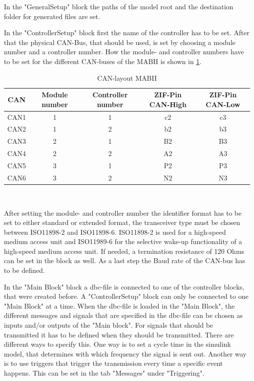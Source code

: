 \documentclass[ExampleMasters.tex]{subfiles}
\begin{document}
In the "GeneralSetup" block the paths of the model root and the destination folder for generated files are set. 

In the "ControllerSetup" block first the name of the controller has to be set. After that the physical CAN-Bus, that should be used, is set by choosing a module number and a controller number. How the module- and controller numbers have to be set for the different CAN-buses of the MABII is shown in \ref{tab:CAN-layout}.
\begin{table}[h]
	\centering
	\caption{CAN-layout MABII}
	\label{tab:CAN-layout}
	\begin{tabular}{c|c|c|c|c|}
		CAN   & Module number & Controller number & ZIF-Pin CAN-High & ZIF-Pin CAN-Low  \\ \hline
		CAN1     &       1 & 1  & c2 & c3         \\
		CAN2   &      1 & 2  & b2 & b3    \\
		CAN3 &      2 & 1 & B2 & B3        \\
		CAN4& 2 & 2 & A2 & A3  \\
		CAN5& 3 & 1 & P2 & P3 \\
		CAN6& 3 & 2 & N2 & N3 \\
	\end{tabular} \\
\end{table}

After setting the module- and controller number the identifier format has to be set to either standard or extended format, the transceiver type must be chosen between ISO11898-2 and ISO11898-6. ISO11898-2 is used for a high-speed medium access unit and ISO11989-6 for the selective wake-up functionality of a high-speed medium access unit. If needed, a termination resistance of 120 Ohms can be set in the block as well. As a last step the Baud rate of the CAN-bus has to be defined.


In the "Main Block" block a dbc-file is connected to one of the controller blocks, that were created before. A "ControllerSetup" block can only be connected to one "Main Block" at a time. When the dbc-file is loaded in the "Main Block", the different messages and signals that are specified in the dbc-file can be chosen as inputs and/or outputs of the "Main block". For signals that should be transmitted it has to be defined when they should be transmitted. There are different ways to specify this. One way is to set a cycle time in the simulink model, that determines with which frequency the signal is sent out. Another way is to use triggers that trigger the transmission every time a specific event happens. This can be set in the tab "Messages" under "Triggering".
\end{document}
